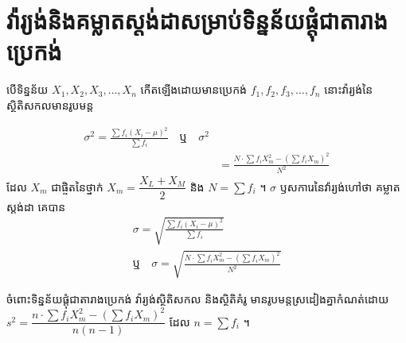 \section{វ៉ារ្យង់និងគម្លាតស្តង់ដាសម្រាប់ទិន្នន័យផ្ដុំជាតារាងប្រេកង់}
បើទិន្នន័យ $X_1, X_2, X_3, \dots, X_n$ កើតឡើងដោយមានប្រេកង់ $f_1, f_2, f_3, \dots, f_n$ នោះវ៉ារ្យង់នៃស្ថិតិសកលមានរូបមន្ត
\begin{formulaBox}[រូបមន្ត]
\[
\begin{aligned}
\sigma^2 = \frac{\sum f_i(X_i - \mu)^2}{\sum f_i} \quad \text{ឬ} \quad \sigma^2 &\\
&= \frac{N\cdot\sum f_iX_m^2 - \left(\sum f_iX_m\right)^2}{N^2}
\end{aligned}
\]
ដែល $X_m$ ជាផ្ចិតនៃថ្នាក់ $X_m = \dfrac{X_L + X_M}{2}$ និង $N = \sum f_i$ ។ $\sigma$ ឫសការេនៃវ៉ារ្យង់ហៅថា គម្លាតស្តង់ដា គេបាន
\[
\begin{gathered}
\sigma = \sqrt{\frac{\sum f_i(X_i - \mu)^2}{\sum f_i}}\\
\text{ឬ} \quad \sigma = \sqrt{\frac{N\cdot\sum f_iX_m^2 - \left(\sum f_iX_m\right)^2}{N^2}}
\end{gathered}
\]
\end{formulaBox}

\begin{note}[សម្គាល់]
ចំពោះទិន្នន័យផ្ដុំជាតារាងប្រេកង់ វ៉ារ្យង់ស្ថិតិសកល និងស្ថិតិគំរូ មានរូបមន្តស្រដៀងគ្នាកំណត់ដោយ $s^2 = \dfrac{n\cdot\sum f_iX_m^2 - \left(\sum f_iX_m\right)^2}{n(n - 1)}$ ដែល $n = \sum f_i$ ។
\end{note}

